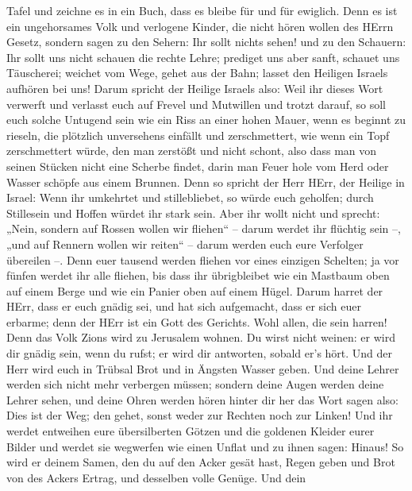 Tafel und zeichne es in ein Buch, dass es bleibe für und für ewiglich.
 Denn es ist ein ungehorsames Volk und verlogene Kinder, die
nicht hören wollen des HErrn Gesetz,  sondern sagen zu den
Sehern: Ihr sollt nichts sehen! und zu den Schauern: Ihr sollt uns nicht
schauen die rechte Lehre; prediget uns aber sanft, schauet uns
Täuscherei;  weichet vom Wege, gehet aus der Bahn; lasset
den Heiligen Israels aufhören bei uns!  Darum spricht der
Heilige Israels also: Weil ihr dieses Wort verwerft und verlasst euch
auf Frevel und Mutwillen und trotzt darauf,  so soll euch
solche Untugend sein wie ein Riss an einer hohen Mauer, wenn es beginnt
zu rieseln, die plötzlich unversehens einfällt und zerschmettert,
 wie wenn ein Topf zerschmettert würde, den man zerstößt
und nicht schont, also dass man von seinen Stücken nicht eine Scherbe
findet, darin man Feuer hole vom Herd oder Wasser schöpfe aus einem
Brunnen.  Denn so spricht der Herr HErr, der Heilige in
Israel: Wenn ihr umkehrtet und stillebliebet, so würde euch geholfen;
durch Stillesein und Hoffen würdet ihr stark sein. Aber ihr wollt nicht
 und sprecht: „Nein, sondern auf Rossen wollen wir
fliehen`` -- darum werdet ihr flüchtig sein --, „und auf Rennern wollen
wir reiten`` -- darum werden euch eure Verfolger übereilen --.
 Denn euer tausend werden fliehen vor eines einzigen
Schelten; ja vor fünfen werdet ihr alle fliehen, bis dass ihr
übrigbleibet wie ein Mastbaum oben auf einem Berge und wie ein Panier
oben auf einem Hügel.  Darum harret der HErr, dass er euch
gnädig sei, und hat sich aufgemacht, dass er sich euer erbarme; denn der
HErr ist ein Gott des Gerichts. Wohl allen, die sein harren!
 Denn das Volk Zions wird zu Jerusalem wohnen. Du wirst
nicht weinen: er wird dir gnädig sein, wenn du rufst; er wird dir
antworten, sobald er's hört.  Und der Herr wird euch in
Trübsal Brot und in Ängsten Wasser geben. Und deine Lehrer werden sich
nicht mehr verbergen müssen; sondern deine Augen werden deine Lehrer
sehen,  und deine Ohren werden hören hinter dir her das
Wort sagen also: Dies ist der Weg; den gehet, sonst weder zur Rechten
noch zur Linken!  Und ihr werdet entweihen eure
übersilberten Götzen und die goldenen Kleider eurer Bilder und werdet
sie wegwerfen wie einen Unflat und zu ihnen sagen: Hinaus! 
So wird er deinem Samen, den du auf den Acker gesät hast, Regen geben
und Brot von des Ackers Ertrag, und desselben volle Genüge. Und dein
